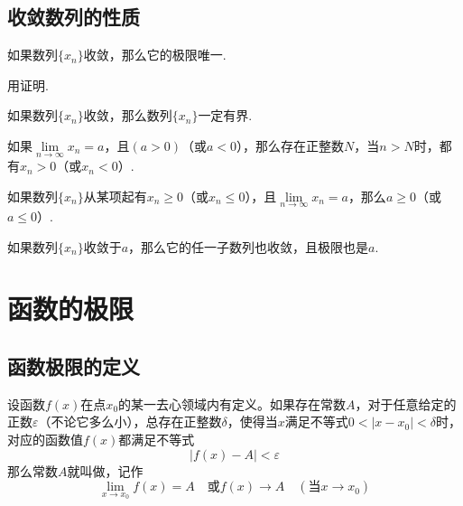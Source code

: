 \subsection{收敛数列的性质}
\begin{theorem}[极限的唯一性]
	如果数列\( \{x_{n}\} \)收敛，那么它的极限唯一.
\end{theorem}

\begin{remark}
	用证明.
\end{remark}

\begin{theorem}[收敛数列的有界性]
	如果数列\( \{x_{n}\} \)收敛，那么数列\( \{x_{n}\} \)一定有界.
\end{theorem}

\begin{theorem}[收敛数列的保号性]
	如果\( \lim\limits_{n \to \infty} x_{n} = a \)，且\( (a > 0) \)（或\( a < 0 \)），那么存在正整数\( N \)，当\( n > N \)时，都有\( x_{n} > 0 \)（或\( x_{n} < 0 \)）.
\end{theorem}

\begin{corollary}
	如果数列\( \{x_{n}\} \)从某项起有\( x_{n} \geqslant 0 \)（或\( x_{n} \leqslant 0 \)），且\( \lim\limits_{n \to \infty} x_{n} = a \)，那么\( a \geqslant 0 \)（或\(  a \leqslant 0 \)）.
\end{corollary}

\begin{theorem}[收敛数列与其子数列间的关系]
	如果数列\( \{x_{n}\} \)收敛于\( a \)，那么它的任一子数列也收敛，且极限也是\( a \).
\end{theorem}

\section{函数的极限}
\subsection{函数极限的定义}

\begin{definition}[函数极限]
	\label{def:fctlim1}
	设函数\( f(x) \)在点\( x_{0} \)的某一去心领域内有定义。如果存在常数\( A \)，对于任意给定的正数\( \varepsilon \)（不论它多么小），总存在正整数\( \delta \)，使得当\( x \)满足不等式\( 0 < |x - x_{0}| < \delta \)时，对应的函数值\( f(x) \)都满足不等式
	\[ |f(x) - A| < \varepsilon \]
	那么常数\( A \)就叫做，记作
	\[ \lim_{x \to x_{0}}f(x) = A\quad \text{或} f(x) \rightarrow A\quad (\text{当}x \rightarrow x_{0}) \]
\end{definition}

